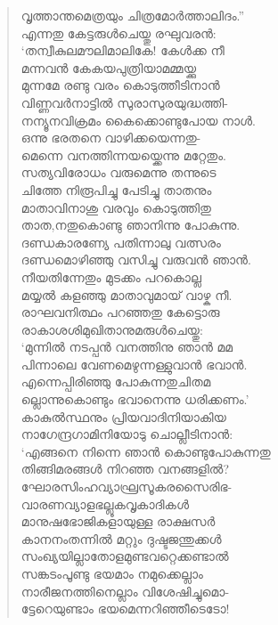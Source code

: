 \begin{verse}
വൃത്താന്തമെത്രയും ചിത്രമോര്‍ത്താലിദം.”\\
എന്നതു കേട്ടരുള്‍ചെയ്തു രഘുവരന്‍:\\
‘തന്വീകുലമൗലിമാലികേ! കേള്‍ക്ക നീ\\
മന്നവന്‍ കേകയപുത്രിയാമമ്മയ്ക്കു\\
മുന്നമേ രണ്ടു വരം കൊടുത്തീടിനാന്‍\\
വിണ്ണവര്‍നാട്ടില്‍ സുരാസുരയുദ്ധത്തി-\\
നന്യൂനവിക്രമം കൈക്കൊണ്ടുപോയ നാള്‍.\\
ഒന്നു ഭരതനെ വാഴിക്കയെന്നതു-\\
മെന്നെ വനത്തിന്നയയ്ക്കെന്നു മറ്റേതും.\\
സത്യവിരോധം വരുമെന്നു തന്നുടെ\\
ചിത്തേ നിരൂപിച്ചു പേടിച്ചു താതനും\\
മാതാവിനാശു വരവും കൊടുത്തിതു\\
താത,നതുകൊണ്ടു ഞാനിന്നു പോകുന്നു.\\
ദണ്ഡകാരണ്യേ പതിന്നാലു വത്സരം\\
ദണ്ഡമൊഴിഞ്ഞു വസിച്ചു വരുവന്‍ ഞാന്‍.\\
നീയതിന്നേതും മുടക്കം പറകൊല്ല\\
മയ്യല്‍ കളഞ്ഞു മാതാവുമായ് വാഴ്ക നീ.\\
രാഘവനിത്ഥം പറഞ്ഞതു കേട്ടൊരു\\
രാകാശശിമുഖിതാനുമരുള്‍ചെയ്തു:\\
‘മുന്നില്‍ നടപ്പന്‍ വനത്തിനു ഞാന്‍ മമ\\
പിന്നാലെ വേണമെഴുന്നള്ളുവാന്‍ ഭവാന്‍.\\
എന്നെപ്പിരിഞ്ഞു പോകുന്നതുചിതമ\\
ല്ലൊന്നുകൊണ്ടും ഭവാനെന്നു ധരിക്കണം.’\\
കാകുല്‍സ്ഥനും പ്രിയവാദിനിയാകിയ\\
നാഗേന്ദ്രഗാമിനിയോടു ചൊല്ലീടിനാന്‍:\\
‘എങ്ങനെ നിന്നെ ഞാന്‍ കൊണ്ടുപോകുന്നതു\\
തിങ്ങിമരങ്ങള്‍ നിറഞ്ഞ വനങ്ങളില്‍?\\
ഘോരസിംഹവ്യാഘ്രസൂകരസൈരിഭ-\\
വാരണവ്യാളഭല്ലൂകവൃകാദികള്‍\\
മാനുഷഭോജികളായുള്ള രാക്ഷസര്‍\\
കാനനംതന്നില്‍ മറ്റും ദുഷ്ടജന്തുക്കള്‍\\
സംഖ്യയില്ലാതോളമുണ്ടവറ്റെക്കണ്ടാല്‍\\
സങ്കടംപൂണ്ടു ഭയമാം നമുക്കെല്ലാം\\
നാരീജനത്തിനെല്ലാം വിശേഷിച്ചുമൊ-\\
ട്ടേറെയുണ്ടാം ഭയമെന്നറിഞ്ഞീടെടോ!\\

\end{verse}
